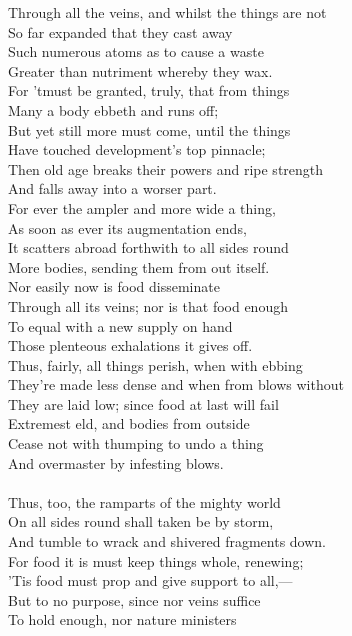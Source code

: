 Through all the veins, and whilst the things are not\\
So far expanded that they cast away\\
Such numerous atoms as to cause a waste\\
Greater than nutriment whereby they wax.\\
For 'tmust be granted, truly, that from things\\
Many a body ebbeth and runs off;\\
But yet still more must come, until the things\\
Have touched development's top pinnacle;\\
Then old age breaks their powers and ripe strength\\
And falls away into a worser part.\\
For ever the ampler and more wide a thing,\\
As soon as ever its augmentation ends,\\
It scatters abroad forthwith to all sides round\\
More bodies, sending them from out itself.\\
Nor easily now is food disseminate\\
Through all its veins; nor is that food enough\\
To equal with a new supply on hand\\
Those plenteous exhalations it gives off.\\
Thus, fairly, all things perish, when with ebbing\\
They're made less dense and when from blows without\\
They are laid low; since food at last will fail\\
Extremest eld, and bodies from outside\\
Cease not with thumping to undo a thing\\
And overmaster by infesting blows.\\
\\
Thus, too, the ramparts of the mighty world\\
On all sides round shall taken be by storm,\\
And tumble to wrack and shivered fragments down.\\
For food it is must keep things whole, renewing;\\
'Tis food must prop and give support to all,—\\
But to no purpose, since nor veins suffice\\
To hold enough, nor nature ministers\\
